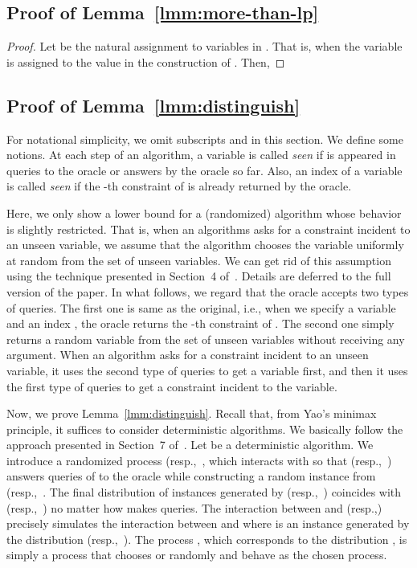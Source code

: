 \documentclass[letterpaper, 11pt]{article}
\begin{document}
\subsection{Proof of Lemma~\ref{lmm:more-than-lp}}\label{sec:more-than-lp}
\begin{proof}
  Let  be the natural assignment to variables in .
  That is,  when the variable  is assigned to the value  in the construction of .
  Then,
  
\end{proof}

\subsection{Proof of Lemma~\ref{lmm:distinguish}}\label{sec:distinguish}
For notational simplicity, we omit subscripts  and  in this section.
We define some notions.
At each step of an algorithm,
a variable  is called \textit{seen} if  is appeared in queries to the oracle or answers by the oracle so far. 
Also, an index  of a variable  is called \textit{seen} if the -th constraint of  is already returned by the oracle.

Here, we only show a lower bound for a (randomized) algorithm whose behavior is slightly restricted.
That is, when an algorithms asks for a constraint incident to an unseen variable, 
we assume that the algorithm chooses the variable uniformly at random from the set of unseen variables.
We can get rid of this assumption using the technique presented in Section~4 of~\cite{GT03}.
Details are deferred to the full version of the paper.
In what follows, we regard that the oracle accepts two types of queries.
The first one is same as the original, i.e., when we specify a variable  and an index , the oracle returns the -th constraint of .
The second one simply returns a random variable from the set of unseen variables without receiving any argument.
When an algorithm asks for a constraint incident to an unseen variable,
it uses the second type of queries to get a variable first, 
and then it uses the first type of queries to get a constraint incident to the variable.

Now, we prove Lemma~\ref{lmm:distinguish}.
Recall that, from Yao's minimax principle, it suffices to consider deterministic algorithms.
We basically follow the approach presented in Section~7 of~\cite{GR08}.
Let  be a deterministic algorithm.
We introduce a randomized process  (resp.,~, 
which interacts with  so that  (resp.,~) answers queries of  to the oracle while constructing a random instance from  (resp.,~.
The final distribution of instances generated by  (resp.,~) coincides with  (resp.,~) no matter how  makes queries.
The interaction between  and  (resp.,) precisely simulates the interaction between  and  where  is an instance generated by the distribution  (resp.,~).
The process , which corresponds to the distribution ,
is simply a process that chooses  or  randomly and behave as the chosen process.
\end{document}
